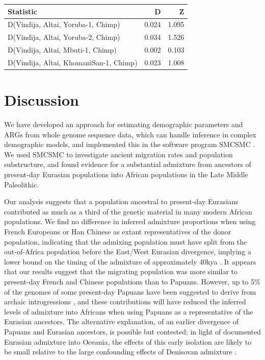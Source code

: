 \begin{table}[ht]
\centering
\begin{tabular}{lrr}
  \hline
Statistic & D & Z \\ 
  \hline
D(Vindija, Altai, Yoruba-1, Chimp) & 0.024 & 1.095 \\ 
  D(Vindija, Altai, Yoruba-2, Chimp) & 0.034 & 1.526 \\ 
  D(Vindija, Altai, Mbuti-1, Chimp) & 0.002 & 0.103 \\ 
  D(Vindija, Altai, KhomaniSan-1, Chimp) & 0.023 & 1.008 \\ 
    \hline
\end{tabular}
\label{dstats:a6}
\end{table}



\section{Discussion}
We have developed an approach for estimating demographic parameters and ARGs from whole genome sequence data, which can handle inference in complex demographic models, and implemented this in the software program SMCSMC \cite{Henderson2018}. We used SMCSMC to investigate ancient migration rates and population substructure, and found evidence for a substantial admixture from ancestors of present-day Eurasian populations into African populations in the Late Middle Paleolithic.

Our analysis suggests that a population ancestral to present-day Eurasians contributed as much as a third of the genetic material in many modern African populations. We find no difference in inferred admixture proportions when using French Europeans or Han Chinese as extant representatives of the donor population, indicating that the admixing population must have split from the out-of-Africa population before the East/West Eurasian divergence, implying a lower bound on the timing of the admixture of approximately 40kya \cite{Mathieson2014}. It appears that our results suggest that the migrating population was more similar to present-day French and Chinese populations than to Papuans.  However, up to 5\% of the genomes of some present-day Papuans have been suggested to derive from archaic introgressions \cite{Sankararaman2016}, and these contributions will have reduced the inferred levels of admixture into Africans when using Papuans as a representative of the Eurasian ancestors.
The alternative explanation, of an earlier divergence of Papuans and Eurasian ancestors, is possible but contested; in light of documented Eurasian admixture into Oceania, the effects of this early isolation are likely to be small relative to the large confounding effects of Denisovan admixture \cite{Malaspinas2016, Nielsen2017a}.


